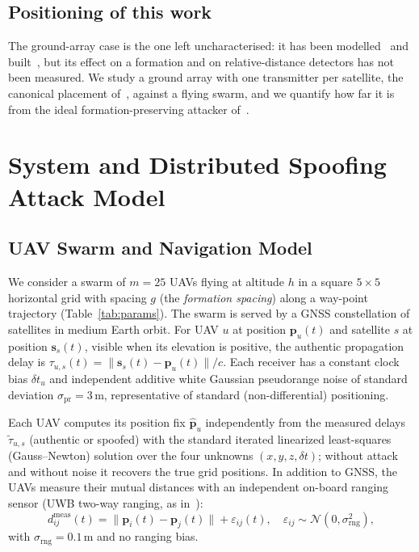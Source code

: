 \documentclass[conference]{IEEEtran}
\newcommand{\ptrue}[1]{\mathbf{p}_{#1}}
\newcommand{\pest}[1]{\hat{\mathbf{p}}_{#1}}
\begin{document}
\subsection{Positioning of this work}
The ground-array case is the one left uncharacterised: it has been
modelled~\cite{ceccato2020spatial} and built~\cite{cheng2025distributed},
but its effect on a formation and on relative-distance detectors has not
been measured. We study a ground array with one transmitter per
satellite, the canonical placement
of~\cite[Result~7]{tippenhauer2011requirements}, against a flying
swarm, and we quantify how far it is from the ideal formation-preserving
attacker of~\cite{tibaldo2025gnsswasp,park2026rigidshift}.

\section{System and Distributed Spoofing Attack Model}
\label{sec:model}

\subsection{UAV Swarm and Navigation Model}
We consider a swarm of $m=25$ UAVs flying at altitude $h$ in a square
$5\times5$ horizontal grid with spacing $g$ (the \emph{formation
spacing}) along a way-point trajectory (Table~\ref{tab:params}). The
swarm is served by a GNSS constellation of satellites in medium Earth
orbit. For UAV $u$ at position $\ptrue{u}(t)$ and satellite $s$ at
position $\mathbf{s}_s(t)$, visible when its elevation is positive, the
authentic propagation delay is
$\tau_{u,s}(t)=\lVert\mathbf{s}_s(t)-\ptrue{u}(t)\rVert/c$. Each receiver
has a constant clock bias $\delta t_u$ and independent additive white
Gaussian pseudorange noise of standard deviation
$\sigma_{\mathrm{pr}}=3$\,m, representative of standard (non-differential)
positioning.

Each UAV computes its position fix $\pest{u}$ independently from the
measured delays $\tilde{\tau}_{u,s}$ (authentic or spoofed) with the
standard iterated linearized least-squares (Gauss--Newton) solution over
the four unknowns $(x,y,z,\delta t)$; without attack and without noise
it recovers the true grid positions. In addition to GNSS, the UAVs
measure their mutual distances with an independent on-board ranging
sensor (UWB two-way ranging, as in~\cite{mykytyn2023uwb}):
\begin{equation}
d^{\mathrm{meas}}_{ij}(t) = \lVert\ptrue{i}(t)-\ptrue{j}(t)\rVert
 + \varepsilon_{ij}(t),\quad
\varepsilon_{ij}\sim\mathcal{N}(0,\sigma^2_{\mathrm{rng}}),
\label{eq:uwb}
\end{equation}
with $\sigma_{\mathrm{rng}}=0.1$\,m and no ranging bias.
\end{document}

